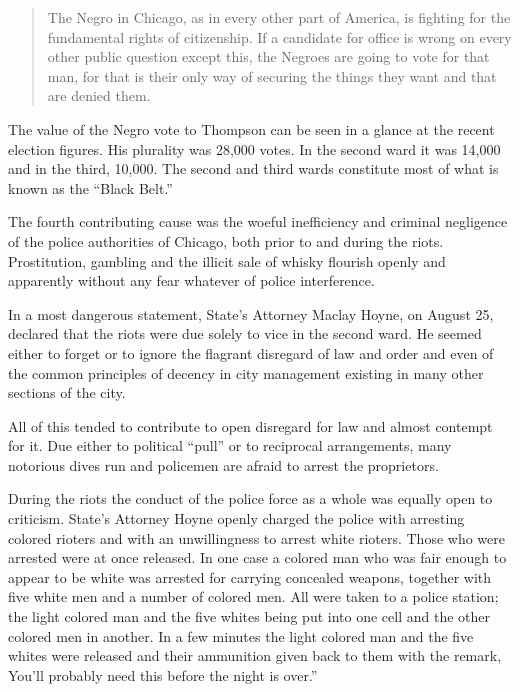 \documentclass[11pt,article,oneside]{memoir}
\begin{document}
\begin{quote}
The Negro in Chicago, as in every other part of America, is fighting for
the fundamental rights of citizenship. If a candidate for office is
wrong on every other public question except this, the Negroes are going
to vote for that man, for that is their only way of securing the things
they want and that are denied them.
\end{quote}

The value of the Negro vote to Thompson can be seen in a glance at the
recent election figures. His plurality was 28,000 votes. In the second
ward it was 14,000 and in the third, 10,000. The second and third wards
constitute most of what is known as the ``Black Belt.''

The fourth contributing cause was the woeful inefficiency and criminal
negligence of the police authorities of Chicago, both prior to and
during the riots. Prostitution, gambling and the illicit sale of whisky
flourish openly and apparently without any fear whatever of police
interference.

In a most dangerous statement, State's Attorney Maclay Hoyne, on August
25, declared that the riots were due solely to vice in the second ward.
He seemed either to forget or to ignore the flagrant disregard of law
and order and even of the common principles of decency in city
management existing in many other sections of the city.

All of this tended to contribute to open disregard for law and almost
contempt for it. Due either to political ``pull'' or to reciprocal
arrangements, many notorious dives run and policemen are afraid to
arrest the proprietors.

During the riots the conduct of the police force as a whole was equally
open to criticism. State's Attorney Hoyne openly charged the police with
arresting colored rioters and with an unwillingness to arrest white
rioters. Those who were arrested were at once released. In one case a
colored man who was fair enough to appear to be white was arrested for
carrying concealed weapons, together with five white men and a number of
colored men. All were taken to a police station; the light colored man
and the five whites being put into one cell and the other colored men in
another. In a few minutes the light colored man and the five whites were
released and their ammunition given back to them with the remark, You'll
probably need this before the night is over.''
\end{document}
